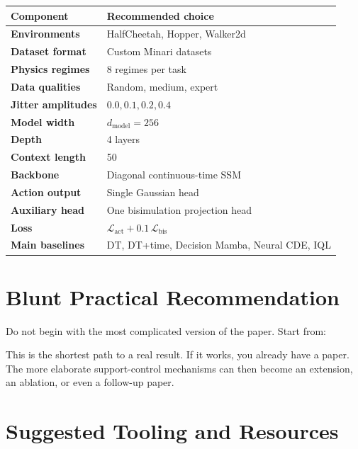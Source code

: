 \documentclass[11pt]{article}
\begin{document}
\begin{center}
\begin{tabularx}{0.94\textwidth}{>{\bfseries}p{}X}
\toprule
Component & Recommended choice \\
\midrule
Environments & HalfCheetah, Hopper, Walker2d \\
Dataset format & Custom Minari datasets \\
Physics regimes & 8 regimes per task \\
Data qualities & Random, medium, expert \\
Jitter amplitudes & $0.0, 0.1, 0.2, 0.4$ \\
Model width & $d_{\text{model}} = 256$ \\
Depth & 4 layers \\
Context length & 50 \\
Backbone & Diagonal continuous-time SSM \\
Action output & Single Gaussian head \\
Auxiliary head & One bisimulation projection head \\
Loss & $\mathcal{L}_{\text{act}} + 0.1\,\mathcal{L}_{\text{bis}}$ \\
Main baselines & DT, DT+time, Decision Mamba, Neural CDE, IQL \\
\bottomrule
\end{tabularx}
\end{center}

\section{Blunt Practical Recommendation}

Do not begin with the most complicated version of the paper. Start from:
\begin{center}
\end{center}

This is the shortest path to a real result. If it works, you already have a paper. The more elaborate support-control mechanisms can then become an extension, an ablation, or even a follow-up paper.

\section{Suggested Tooling and Resources}
\end{document}
